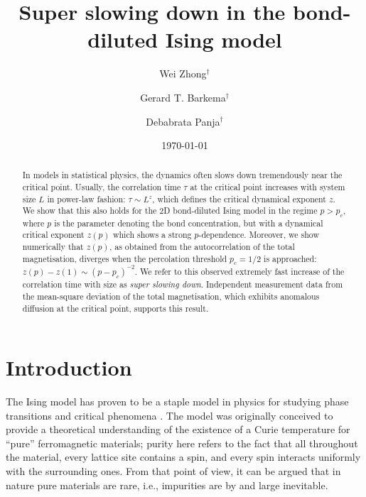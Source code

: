 \documentclass[12pt,nofootinbib,aps,amsmath,amssymb,preprint,showpacs]{revtex4}
\begin{document}
\title{Super slowing down in the bond-diluted Ising model}
\author{Wei Zhong$^\dagger$} 
\author{Gerard T. Barkema$^\dagger$}
\author{Debabrata Panja$^\dagger$}
 

\date{\today} 

\begin{abstract} 
In models in statistical physics, the dynamics often slows down tremendously near the critical point.
Usually, the correlation time $\tau$ at the critical point increases with system size $L$ in power-law 
fashion: $\tau \sim L^z$, which defines the critical dynamical exponent $z$. We show that this also holds
for the 2D bond-diluted Ising model in the regime $p>p_c$, where $p$ is the parameter denoting the bond concentration, 
but with a dynamical critical exponent $z(p)$ which shows a strong $p$-dependence.
Moreover, we show numerically that $z(p)$, as obtained from the autocorrelation of the total magnetisation, 
diverges when the percolation threshold $p_c=1/2$ is approached:
$z(p)-z(1) \sim (p-p_c)^{-2}$. We refer to this observed extremely fast increase of the correlation time with size 
as {\it super slowing down}. Independent measurement data from
the mean-square deviation of the total magnetisation, which
exhibits anomalous diffusion at the critical point, supports this result.
\end{abstract}

\maketitle
 
\section{Introduction \label{sce1}}

The Ising model has proven to be a staple model in physics for
studying phase transitions and critical phenomena
\cite{stanley,hohen}. The model was originally conceived to provide a
theoretical understanding of the existence of a Curie temperature for
``pure'' ferromagnetic materials; purity here refers to the fact that
all throughout the material, every lattice site contains a spin, and
every spin interacts uniformly with the surrounding ones. From that
point of view, it can be argued that in nature pure materials are
rare, i.e., impurities are by and large inevitable.
\end{document}
